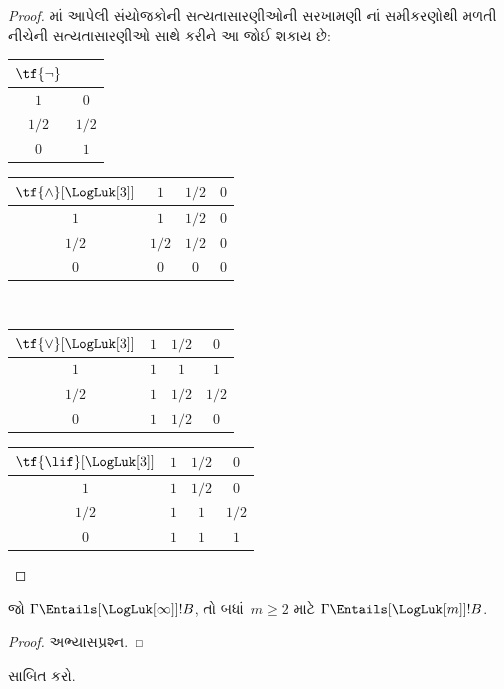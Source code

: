 \begin{proof}
  માં આપેલી સંયોજકોની
  સત્યતાસારણીઓની સરખામણી નાં
  સમીકરણોથી મળતી નીચેની સત્યતાસારણીઓ સાથે કરીને આ જોઈ શકાય છે:
  \begin{center}
    \begin{tabular}{c|c}
      $\tf{\lnot}$ & \\
      \hline
      $1$ & $0$ \\
      $1/2$ & $1/2$ \\
      $0$ & $1$
    \end{tabular}
    \quad
    \begin{tabular}{c|ccc}
      $\tf{\land}[\LogLuk[3]]$ & $1$ & $1/2$ & $0$ \\
      \hline
      $1$ & $1$ & $1/2$ & $0$ \\
      $1/2$ & $1/2$ & $1/2$ & $0$\\
      $0$ & $0$ & $0$ & $0$
    \end{tabular}
    \\[2ex]
    \begin{tabular}{c|ccc}
      $\tf{\lor}[\LogLuk[3]]$ & $1$ & $1/2$ & $0$ \\
      \hline
      $1$ & $1$ & $1$ & $1$ \\
      $1/2$ & $1$ & $1/2$ & $1/2$ \\
      $0$ & $1$ & $1/2$ & $0$
    \end{tabular}
    \quad
    \begin{tabular}{c|ccc}
      $\tf{\lif}[\LogLuk[3]]$ & $1$ & $1/2$ & $0$ \\
      \hline
      $1$ & $1$ & $1/2$ & $0$ \\
      $1/2$ & $1$ & $1$ & $1/2$ \\
      $0$ & $1$ & $1$ & $1$
    \end{tabular}
  \end{center}
\end{proof}

\begin{prop}
  જો $\Gamma \Entails[\LogLuk[\infty]] !B$, તો બધાં~$m \ge 2$
  માટે $\Gamma \Entails[\LogLuk[m]] !B$.
\end{prop}

\begin{proof}
  અભ્યાસપ્રશ્ન.
\end{proof}

\begin{prob}
   સાબિત કરો.
\end{prob}

